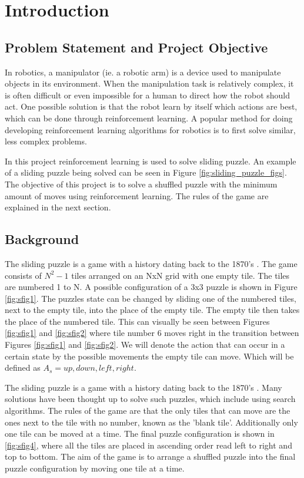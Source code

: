 \graphicspath{{introduction/fig/}}

\chapter{Introduction}
\label{chap:introduction}

\section{Problem Statement and Project Objective}
In robotics, a manipulator (ie. a robotic arm) is a device used to manipulate objects in its environment. When the manipulation task is relatively complex, it is often difficult or even impossible for a human to direct how the robot should act. One possible solution is that the robot learn by itself which actions are best, which can be done through reinforcement learning. A popular method for doing developing reinforcement learning algorithms for robotics is to first solve similar, less complex problems.

In this project reinforcement learning is used to solve sliding puzzle. An example of a sliding puzzle being solved can be seen in Figure \ref{fig:sliding_puzzle_figs}. The objective of this project is to solve a shuffled puzzle with the minimum amount of moves using reinforcement learning. The rules of the game are explained in the next section. 

\section{Background}

The sliding puzzle is a game with a history dating back to the 1870's \cite{15_puz}. The game consists of $N^{2}-1$ tiles arranged on an NxN grid with one empty tile. The tiles are numbered 1 to N. A possible configuration of a 3x3 puzzle is shown in Figure \ref{fig:sfig1}. The puzzles state can be changed by sliding one of the numbered tiles, next to the empty tile, into the place of the empty tile. The empty tile then takes the place of the numbered tile. This can visually be seen between Figures \ref{fig:sfig1}
and \ref{fig:sfig2} where tile number 6 moves right in the transition between Figures \ref{fig:sfig1}
and \ref{fig:sfig2}. We will denote the action that can occur in a certain state by the possible movements the empty tile can move. Which will be defined as $A_s = {up, down, left, right}$.

The sliding puzzle is a game with a history dating back to the 1870's \cite{15_puz}. Many solutions have been thought up to solve such puzzles, which include using search algorithms\cite{search_alg}. The rules of the game are that the only tiles that can move are the ones next to the tile with no number, known as the 'blank tile'. Additionally only one tile can be moved at a time. The final puzzle configuration is shown in \ref{fig:sfig4}, where all the tiles are placed in ascending order read left to right and top to bottom. The aim of the game is to arrange a shuffled puzzle into the final puzzle configuration by moving one tile at a time.

